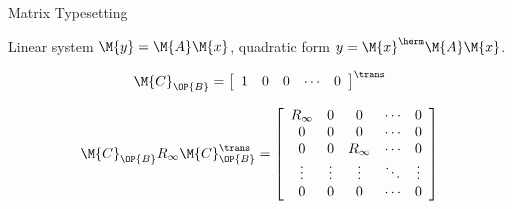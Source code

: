 \documentclass[xcolor=dvipsnames, aspectratio=169, handout, intlimits]{beamer}
\providecommand{\Cmat}{\ensuremath{\M{C}}}
\providecommand{\setB}{\ensuremath{\OP{B}}}
\begin{document}
\begin{frame}{Matrix Typesetting}

\vspace{-0.5cm}
Linear system $\M{y} = \M{A} \M{x}$, quadratic form $y = \M{x}^\herm \M{A} \M{x}$.

\begin{equation*}
\Cmat_\setB =
\left[ {\begin{array}{ccccc}
	1 & 0 & 0 & \cdots & 0\\
	\end{array} } \right]^\trans
\end{equation*}

\begin{equation*}
\Cmat_\setB R_\infty \Cmat_\setB^\trans =
\left[ {\begin{array}{ccccc}
	R_\infty & 0 & 0 & \cdots & 0\\
	0 & 0 & 0 & \cdots & 0\\		
	0 & 0 & R_\infty & \cdots & 0\\
	\vdots & \vdots & \vdots & \ddots & \vdots \\
	0 & 0 & 0 & \cdots & 0\\		
\end{array} } \right]
\end{equation*}

\end{frame}
\end{document}
